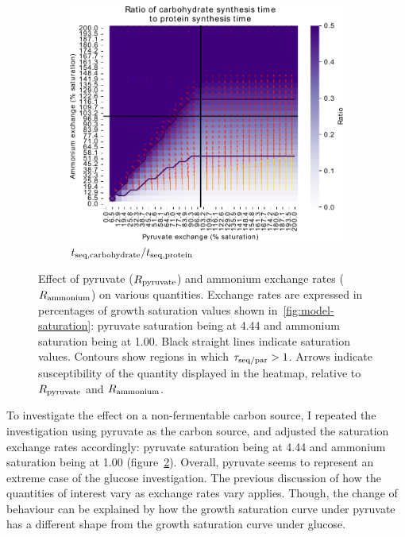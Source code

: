 \begin{figure}
  \begin{subfigure}[t]{0.45\textwidth}
  \centering
    \includegraphics[width=\linewidth]{ec_grid_pyr_amm_carb_to_prot}
    \caption{
      $t_{\mathrm{seq},\mathrm{carbohydrate}}/t_{\mathrm{seq},\mathrm{protein}}$
    }
    \label{fig:model-grid-pyr-carb-to-prot}
  \end{subfigure}
  \caption{
    Effect of pyruvate ($R_{\mathrm{pyruvate}}$) and ammonium exchange rates ($R_{\mathrm{ammonium}}$) on various quantities.
    Exchange rates are expressed in percentages of growth saturation values shown in~\ref{fig:model-saturation}: pyruvate saturation being at \SI{4.44}{\mmolgdwh} and ammonium saturation being at \SI{1.00}{\mmolgdwh}.
    Black straight lines indicate saturation values.
    Contours show regions in which $\tau_{\mathrm{seq}/\mathrm{par}} > 1$.
    Arrows indicate susceptibility of the quantity displayed in the heatmap, relative to $R_{\mathrm{pyruvate}}$ and $R_{\mathrm{ammonium}}$.
  }
  \label{fig:model-grid-pyr}
\end{figure}

To investigate the effect on a non-fermentable carbon source, I repeated the investigation using pyruvate as the carbon source, and adjusted the saturation exchange rates accordingly: pyruvate saturation being at \SI{4.44}{\mmolgdwh} and ammonium saturation being at \SI{1.00}{\mmolgdwh} (figure~\ref{fig:model-grid-pyr}).
Overall, pyruvate seems to represent an extreme case of the glucose investigation.
The previous discussion of how the quantities of interest vary as exchange rates vary applies.
Though, the change of behaviour can be explained by how the growth saturation curve under pyruvate has a different shape from the growth saturation curve under glucose.

